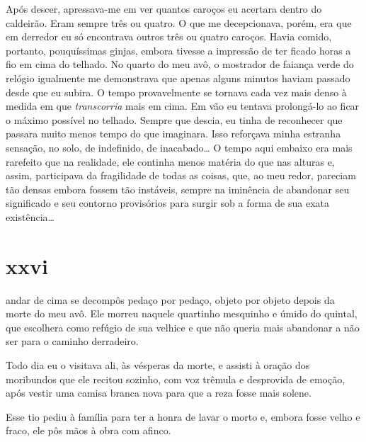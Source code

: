 Após descer, apressava-me em ver quantos caroços eu acertara dentro do
caldeirão. Eram sempre três ou quatro. O que me decepcionava, porém, era que
em derredor eu só encontrava outros três ou quatro caroços. Havia comido,
portanto, pouquíssimas ginjas, embora tivesse a impressão de ter ficado horas
a fio em cima do telhado. No quarto do meu avô, o mostrador de faiança verde
do relógio igualmente me demonstrava que apenas alguns minutos haviam passado
desde que eu subira. O tempo provavelmente se tornava cada vez mais denso à
medida em que \textit{transcorria} mais em cima. Em vão eu tentava
prolongá-lo ao ficar o máximo possível no telhado. Sempre que descia, eu
tinha de reconhecer que passara muito menos tempo do que imaginara. Isso
reforçava minha estranha sensação, no solo, de indefinido, de inacabado\ldots
{} O tempo aqui embaixo era mais rarefeito que na realidade, ele continha
menos matéria do que nas alturas e, assim, participava da fragilidade de
todas as coisas, que, ao meu redor, pareciam tão densas embora fossem tão
instáveis, sempre na iminência de abandonar seu significado e seu contorno
provisórios para surgir sob a forma de sua exata existência\ldots{}


\section{xxvi} 

andar de cima se decompôs pedaço por pedaço, objeto por
 objeto depois da morte do meu avô. Ele morreu naquele quartinho mesquinho e
 úmido do quintal, que escolhera como refúgio de sua velhice e que não queria
 mais abandonar a não ser para o caminho derradeiro.

Todo dia eu o visitava ali, às vésperas da morte, e assisti à oração dos
moribundos que ele recitou sozinho, com voz trêmula e desprovida de emoção,
após vestir uma camisa branca nova para que a reza fosse mais solene.


Esse tio pediu à família para ter a honra de lavar o morto e, embora fosse
velho e fraco, ele pôs mãos à obra com afinco.

